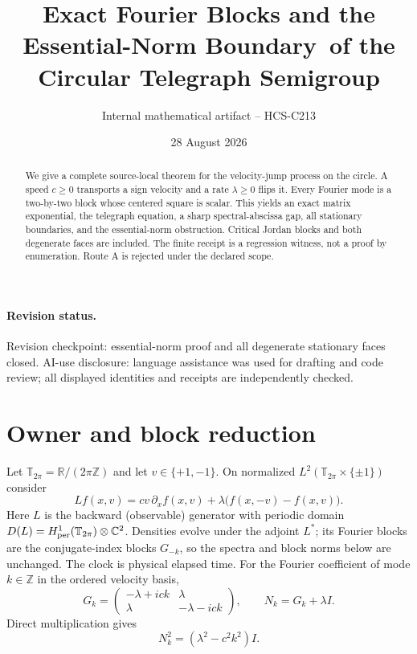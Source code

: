 \documentclass[10pt]{article}
\title{Exact Fourier Blocks and the Essential-Norm Boundary\ of the Circular Telegraph Semigroup}
\author{Internal mathematical artifact -- HCS-C213}
\date{28 August 2026}
\newcommand{\revisionnote}{Revision checkpoint: essential-norm proof and all degenerate stationary faces closed.}
\begin{document}
\maketitle
\begin{abstract}
We give a complete source-local theorem for the velocity-jump process on the
circle.  A speed $c\geq0$ transports a sign velocity and a rate
$\lambda\geq0$ flips it.  Every Fourier mode is a two-by-two block whose
centered square is scalar.  This yields an exact matrix exponential, the
telegraph equation, a sharp spectral-abscissa gap, all stationary boundaries,
and the essential-norm obstruction.  Critical Jordan blocks and both
degenerate faces are included.  The finite receipt is a regression witness,
not a proof by enumeration.  Route A is rejected under the declared scope.
\end{abstract}

\paragraph{Revision status.} \revisionnote\quad
AI-use disclosure: language assistance was used for drafting and code review;
all displayed identities and receipts are independently checked.

\section{Owner and block reduction}
Let $\mathbb T_{2\pi}=\mathbb R/(2\pi\mathbb Z)$ and let
$v\in\{+1,-1\}$.  On normalized
$L^2(\mathbb T_{2\pi}\times\{\pm1\})$ consider
\[
 Lf(x,v)=cv\,\partial_xf(x,v)+\lambda\bigl(f(x,-v)-f(x,v)\bigr).
\]
Here $L$ is the backward (observable) generator with periodic domain
$D(L)=H^1_{\rm per}(\mathbb T_{2\pi})\otimes\mathbb C^2$.  Densities evolve
under the adjoint $L^*$; its Fourier blocks are the conjugate-index blocks
$G_{-k}$, so the spectra and block norms below are unchanged.
The clock is physical elapsed time.  For the Fourier coefficient of mode
$k\in\mathbb Z$ in the ordered velocity basis,
\[
 G_k=\begin{pmatrix}-\lambda+ick&\lambda\\[2pt]
 \lambda&-\lambda-ick\end{pmatrix},\qquad N_k=G_k+\lambda I.
\]
Direct multiplication gives
\begin{equation}\label{eq:square}
 N_k^2=(\lambda^2-c^2k^2)I.
\end{equation}
\end{document}
